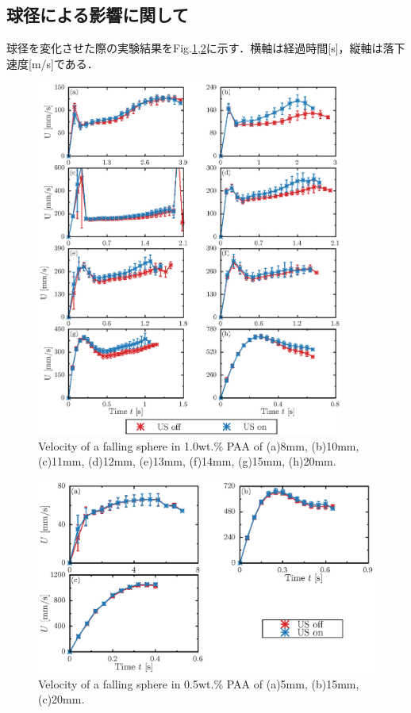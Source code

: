 \clearpage

\subsection{球径による影響に関して}

球径を変化させた際の実験結果をFig.\ref{fig:diameter},\ref{fig:diameter-0.5}に示す．横軸は経過時間[s]，縦軸は落下速度[m/s]である．

\begin{figure}[h]
    \centering
    \includegraphics[width=0.9\textwidth]{X-Appendix/diameter/diameter.eps}
    \caption{Velocity of a falling sphere in 1.0wt.\% PAA of (a)8mm, (b)10mm, (c)11mm, (d)12mm, (e)13mm, (f)14mm, (g)15mm, (h)20mm.}
    \label{fig:diameter}
\end{figure}

\begin{figure}[h]
    \centering
    \includegraphics[width=1\textwidth]{X-Appendix/diameter-0.5/diameter.eps}
    \caption{Velocity of a falling sphere in 0.5wt.\% PAA of (a)5mm, (b)15mm, (c)20mm.}
    \label{fig:diameter-0.5}
\end{figure}
